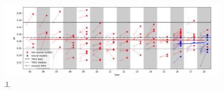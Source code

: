 \begin{figure}[t!]
\centering
  \includegraphics[width=7in]{neural_robust04.png}
\caption{.l.}
\label{fig:bert}
\end{figure}




